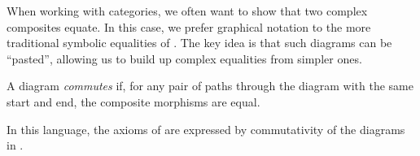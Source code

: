 
\noindent
When working with categories, we often want to show that two complex composites
equate. In this case, we prefer graphical notation to the more traditional
symbolic equalities of . The key idea is that such diagrams
can be ``pasted'', allowing us to build up complex equalities from simpler ones.

\begin{dfn}\label{def:commutative diagram}
	A diagram \emph{commutes} if, for any pair of paths
	through the diagram with the same start and end, the composite morphisms are
	equal.
\end{dfn}

\begin{ex}
	In this language, the axioms of  are expressed by commutativity of the
	diagrams in .
\end{ex}
